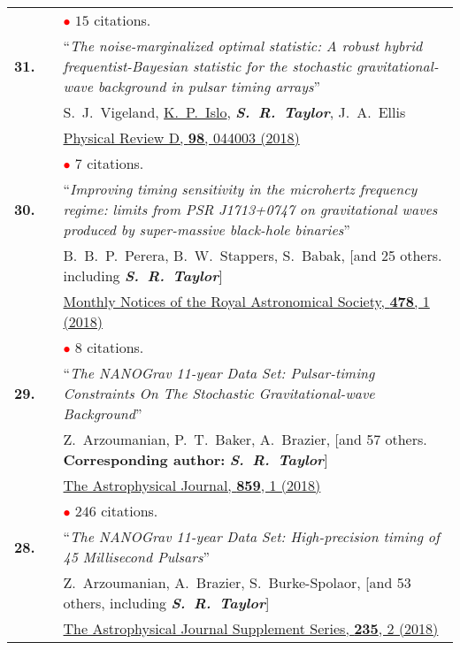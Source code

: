 \documentclass[11pt,letterpaper,sans]{moderncv}
\begin{document}
{\begin{longtable}{rp{0.3cm}p{15.8cm}}
&& \textcolor{red}{$\bullet$} $15$ citations. \vspace{0.09cm}\\
\textbf{31.} & & ``\textit{The noise-marginalized optimal statistic: A robust hybrid frequentist-Bayesian statistic for the stochastic gravitational-wave background in pulsar timing arrays}'' \\ 
&&S.~J.~Vigeland, \underline{K.~P.~Islo}, \textit{\textbf{S.~R.~Taylor}}, J.~A.~Ellis \\
&& \href{https://journals.aps.org/prd/abstract/10.1103/PhysRevD.98.044003}{{\color{color1} Physical Review D, \textbf{98}, 044003 (2018)}}  \\
&& \textcolor{red}{$\bullet$} $7$ citations. \vspace{0.09cm}\\
\textbf{30.} & & ``\textit{Improving timing sensitivity in the microhertz frequency regime: limits from PSR J1713+0747 on gravitational waves produced by super-massive black-hole binaries}'' \\ 
&&B.~B.~P.~Perera, B.~W.~Stappers, S.~Babak, [and 25 others. including \textit{\textbf{S.~R.~Taylor}}]\\
&& \href{https://academic.oup.com/mnras/article-abstract/478/1/218/4990951?redirectedFrom=fulltext}{{\color{color1} Monthly Notices of the Royal Astronomical Society, \textbf{478}, 1 (2018)}}  \\
&& \textcolor{red}{$\bullet$} $8$ citations. \vspace{0.09cm}\\
\textbf{29.} & & ``\textit{The NANOGrav 11-year Data Set: Pulsar-timing Constraints On The Stochastic Gravitational-wave Background}'' \\ 
&&Z.~Arzoumanian, P.~T.~Baker, A.~Brazier, [and 57 others. \textbf{Corresponding author:} \textit{\textbf{S.~R.~Taylor}}]\\
&& \href{http://iopscience.iop.org/article/10.3847/1538-4357/aabd3b/meta}{{\color{color1} The Astrophysical Journal, \textbf{859}, 1 (2018)}}  \\
&& \textcolor{red}{$\bullet$} $246$ citations. \vspace{0.09cm}\\
\textbf{28.} & & ``\textit{The NANOGrav 11-year Data Set: High-precision timing of 45 Millisecond Pulsars}'' \\ 
&&Z.~Arzoumanian, A.~Brazier, S.~Burke-Spolaor, [and 53 others, including \textit{\textbf{S.~R.~Taylor}}]\\
&& \href{http://iopscience.iop.org/article/10.3847/1538-4365/aab5b0/meta}{{\color{color1} The Astrophysical Journal Supplement Series, \textbf{235}, 2 (2018)}}  \\

\end{longtable}}
\end{document}
